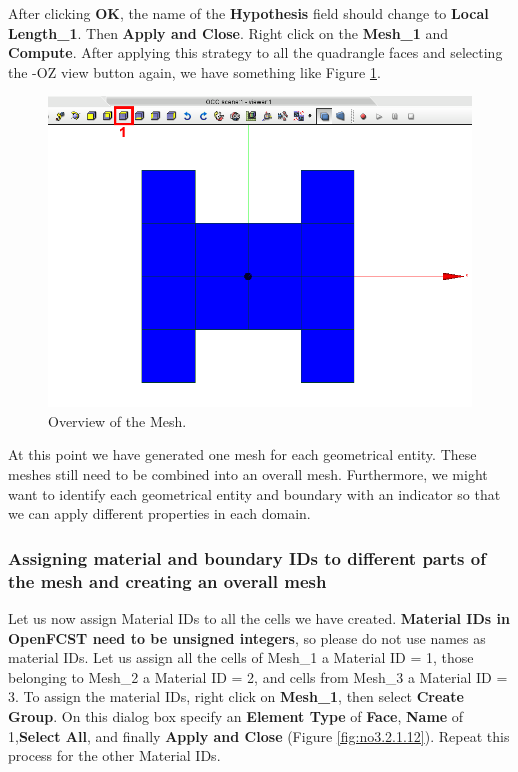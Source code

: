 After clicking \textbf{OK}, the name of the \textbf{Hypothesis} field should change to \textbf{Local Length\_1}. Then \textbf{Apply and Close}. Right click on the \textbf{Mesh\_1} and \textbf{Compute}. After applying this strategy to all the quadrangle faces and selecting the -OZ view button again, we have something like Figure \ref{fig:no3.2.1.11}.

\begin{figure}[h!]
\begin{center}
\includegraphics[scale=0.50]{figures/SalomeStep3c.png}
\caption{Overview of the Mesh.}
\label{fig:no3.2.1.11}
\end{center}
\end{figure}

At this point we have generated one mesh for each geometrical entity. These meshes still need to be combined into an overall mesh. Furthermore, we might want to identify each geometrical entity and boundary with an indicator so that we can apply different properties in each domain.

\subsubsection{Assigning material and boundary IDs to different parts of the mesh and creating an overall mesh}

Let us now assign Material IDs to all the cells we have created. \textbf{Material IDs in OpenFCST need to be unsigned integers}, so please do not use names as material IDs. Let us assign all the cells of Mesh\_1 a Material ID = 1, those belonging to Mesh\_2 a Material ID = 2, and cells from Mesh\_3 a Material ID = 3. To assign the material IDs, right click on \textbf{Mesh\_1}, then select \textbf{Create Group}. On this dialog box specify an \textbf{Element Type} of \textbf{Face}, \textbf{Name} of 1,\textbf{Select All}, and finally \textbf{Apply and Close} (Figure \ref{fig:no3.2.1.12}). Repeat this process for the other Material IDs.

